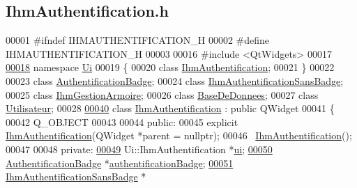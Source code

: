 \hypertarget{_ihm_authentification_8h_source}{}\subsection{Ihm\+Authentification.\+h}
\label{_ihm_authentification_8h_source}

\begin{DoxyCode}
00001 \textcolor{preprocessor}{#ifndef IHMAUTHENTIFICATION\_H}
00002 \textcolor{preprocessor}{#define IHMAUTHENTIFICATION\_H}
00003 
00016 \textcolor{preprocessor}{#include <QtWidgets>}
00017 
\hyperlink{namespace_ui}{00018} \textcolor{keyword}{namespace }\hyperlink{namespace_ui}{Ui}
00019 \{
00020     \textcolor{keyword}{class }\hyperlink{class_ihm_authentification}{IhmAuthentification};
00021 \}
00022 
00023 \textcolor{keyword}{class }\hyperlink{class_authentification_badge}{AuthentificationBadge};
00024 \textcolor{keyword}{class }\hyperlink{class_ihm_authentification_sans_badge}{IhmAuthentificationSansBadge};
00025 \textcolor{keyword}{class }\hyperlink{class_ihm_gestion_armoire}{IhmGestionArmoire};
00026 \textcolor{keyword}{class }\hyperlink{class_base_de_donnees}{BaseDeDonnees};
00027 \textcolor{keyword}{class }\hyperlink{class_utilisateur}{Utilisateur};
00028 
\hyperlink{class_ihm_authentification}{00040} \textcolor{keyword}{class }\hyperlink{class_ihm_authentification}{IhmAuthentification} : \textcolor{keyword}{public} QWidget
00041 \{
00042     Q\_OBJECT
00043 
00044 \textcolor{keyword}{public}:
00045     \textcolor{keyword}{explicit} \hyperlink{class_ihm_authentification}{IhmAuthentification}(QWidget *parent = \textcolor{keyword}{nullptr});
00046     ~\hyperlink{class_ihm_authentification}{IhmAuthentification}();
00047 
00048 \textcolor{keyword}{private}:
\hyperlink{class_ihm_authentification_a2bab782e7f65474f2817c3916ded9d18}{00049}     Ui::IhmAuthentification *\hyperlink{class_ihm_authentification_a2bab782e7f65474f2817c3916ded9d18}{ui}; 
\hyperlink{class_ihm_authentification_ac257a02215ec8d5d31e5a1def0c0e86d}{00050}     \hyperlink{class_authentification_badge}{AuthentificationBadge} *\hyperlink{class_ihm_authentification_ac257a02215ec8d5d31e5a1def0c0e86d}{authentificationBadge};
\hyperlink{class_ihm_authentification_a9444198403beeaf7386488d56f8ad7f2}{00051}     \hyperlink{class_ihm_authentification_sans_badge}{IhmAuthentificationSansBadge} *

\end{DoxyCode}
